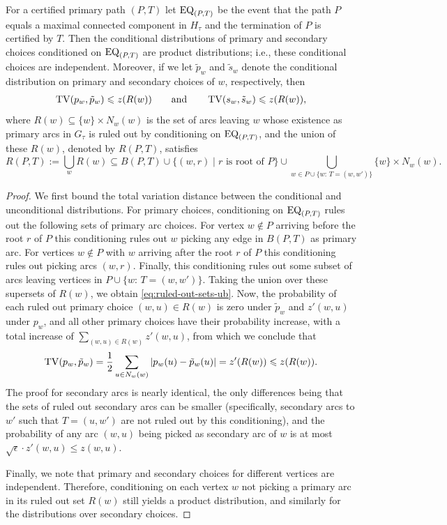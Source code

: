 \begin{lem}\label{lm:conditional-product}
For a certified primary path $(P,T)$ let $\mathrm{EQ}_{(P,T)}$ be the event that the path $P$ equals a maximal connected component in $H_\tau$ and the termination of $P$ is certified by $T$.
Then the conditional distributions of primary and secondary choices conditioned on $\mathrm{EQ}_{(P,T)}$ are product distributions; i.e., these conditional choices are independent. Moreover, if we let $\tilde{p}_w$ and $\tilde{s}_w$ denote the conditional distribution on primary and secondary choices of $w$, respectively, then 
    \begin{align*}
      \operatorname{TV}(p_w, \tilde{p}_w) \leqslant z(R(w)) \qquad \mbox{and} \qquad \operatorname{TV}(s_w, \tilde{s}_w) \leqslant z(R(w)),
    \end{align*}
	where $R(w) \subseteq \{w\}\times N_w(w)$ is the set of arcs leaving $w$ whose existence as primary arcs in $G_\tau$ is ruled out by conditioning on $\mathrm{EQ}_{(P,T)}$, and the union of these $R(w)$, denoted by $R(P,T)$, satisfies
	\begin{equation}\label{eq:ruled-out-sets-ub}
	R(P,T):= \bigcup_w R(w) \subseteq B(P,T) \cup \{(w,r) \mid r \mbox{ is root of } P\} \cup \bigcup_{w\in P\cup\{w:\, T=(w,w')\}} \{w\}\times N_w(w).
	\end{equation}
\end{lem}

\begin{proof}
	We first bound the total variation distance between the conditional and unconditional distributions. For primary choices, conditioning on $\mathrm{EQ}_{(P,T)}$ rules out the following sets of primary arc choices.
	For vertex $w\notin P$ arriving before the root $r$ of $P$ this conditioning rules out $w$ picking any edge in $B(P,T)$ as primary arc.
	For vertices $w\notin P$ with $w$ arriving after the root $r$ of $P$ this conditioning rules out picking arcs $(w,r)$. 
	Finally, this conditioning rules out 
	some subset of arcs leaving vertices in $P\cup \{w:\, T=(w,w')\}$.
	Taking the union over these supersets of $R(w)$, we obtain \eqref{eq:ruled-out-sets-ub}.
	Now, the probability of each ruled out primary choice $(w,u)\in R(w)$ is  zero under $\tilde{p}_w$ and $z'(w,u)$ under $p_w$, and all other primary choices have their probability increase, with a total increase of $\sum_{(w,u)\in R(w)} z'(w,u)$, from which we conclude that $$\operatorname{TV}(p_w,\tilde{p}_w) = \frac{1}{2}\sum_{u\in N_w(w)} |p_w(u) - \tilde{p}_w(u)| = z'(R(w)) \leqslant z(R(w)).$$
	The proof for secondary arcs is nearly identical, the only differences being that the sets of ruled out secondary arcs can be smaller (specifically, secondary arcs to $w'$ such that $T=(u,w')$ are not ruled out by this conditioning), and the probability of any arc $(w,u)$ being picked as secondary arc of $w$ is at most $\sqrt{\epsilon}\cdot z'(w,u) \leq z(w,u)$.
	
	Finally, we note that primary and secondary choices for different vertices are independent. Therefore, conditioning on each vertex $w$ not picking a primary arc in its ruled out set $R(w)$ still yields a product distribution, and similarly for the distributions over secondary choices.
\end{proof}

